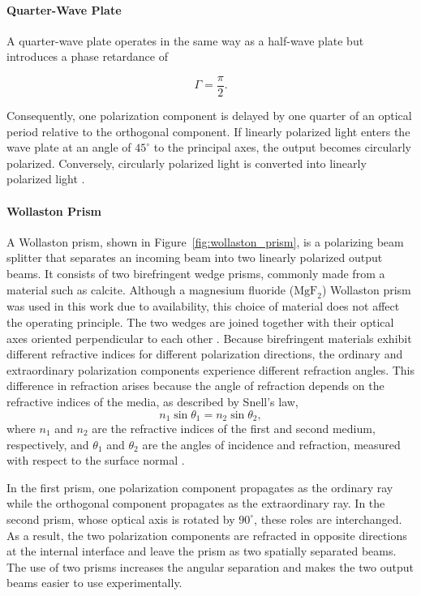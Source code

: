 \paragraph{Quarter-Wave Plate}
A quarter-wave plate operates in the same way as a half-wave plate but introduces a phase retardance of

\begin{equation}
\Gamma=\frac{\pi}{2}.
\end{equation}

Consequently, one polarization component is delayed by one quarter of an optical period relative to the orthogonal component. If linearly polarized light enters the wave plate at an angle of \(45^\circ\) to the principal axes, the output becomes circularly polarized.
Conversely, circularly polarized light is converted into linearly polarized light .

\paragraph{Wollaston Prism}

A Wollaston prism, shown in Figure~\ref{fig:wollaston_prism}, is a polarizing beam splitter that separates an incoming beam into two linearly polarized output beams. It consists of two birefringent wedge prisms, commonly made from a material such as calcite. Although a magnesium fluoride (\(\mathrm{MgF}_2\)) Wollaston prism was used in this work due to availability, this choice of material does not affect the operating principle. The two wedges are joined together with their optical axes oriented perpendicular to each other . Because birefringent materials exhibit different refractive indices for different polarization directions, the ordinary and extraordinary polarization components experience different refraction angles. This difference in refraction arises because the angle of refraction depends on the refractive indices of the media, as described by Snell's law,
\begin{equation}
    n_1 \sin\theta_1 = n_2 \sin\theta_2,
\end{equation}
where \(n_1\) and \(n_2\) are the refractive indices of the first and second medium, respectively, and \(\theta_1\) and \(\theta_2\) are the angles of incidence and refraction, measured with respect to the surface normal .

In the first prism, one polarization component propagates as the ordinary ray while the orthogonal component propagates as the extraordinary ray. In the second prism, whose optical axis is rotated by \(90^\circ\), these roles are interchanged. As a result, the two polarization components are refracted in opposite directions at the internal interface and leave the prism as two spatially separated beams. The use of two prisms increases the angular separation and makes the two output beams easier to use experimentally.


